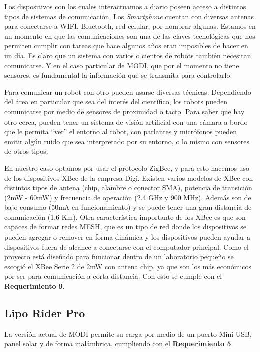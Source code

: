 Los dispositivos con los cuales interactuamos a diario poseen acceso a distintos tipos de sistemas de comunicación. Los \textit{Smartphone} cuentan con diversas antenas para conectarse a WIFI, Bluetooth, red celular,  por nombrar algunas. Estamos en un momento en que las comunicaciones son una de las claves tecnológicas que nos permiten cumplir con tareas que hace algunos años eran imposibles de hacer en un día. Es claro que un sistema con varios o cientos de robots también necesitan comunicarse. Y en el caso particular de MODI, que por el momento no tiene sensores, es fundamental la información que se transmita para controlarlo. 

Para comunicar un robot con otro pueden usarse diversas técnicas. Dependiendo del área en particular que sea del interés del científico, los robots pueden comunicarse por medio de sensores de proximidad o tacto. Para saber que hay otro cerca, pueden tener un sistema de visión artificial con una cámara a bordo que le permita “ver” el entorno al robot, con parlantes y micrófonos pueden emitir algún ruido que sea interpretado por su entorno, o lo mismo con sensores de otros tipos.

En nuestro caso optamos por usar el protocolo ZigBee, y para esto hacemos uso de los dispositivos XBee de la empresa Digi. Existen varios modelos de XBee con distintos tipos de antena (chip, alambre o conector SMA), potencia de transición (2mW - 60mW) y frecuencia de operación (2.4 GHz y 900 MHz). Además son de bajo consumo (50mA en funcionamiento) y se puede tener una gran distancia de comunicación (1.6 Km). Otra característica importante de los XBee es que son capaces de formar redes MESH, que es un tipo de red donde los dispositivos se pueden agregar o remover en forma dinámica y los dispositivos pueden ayudar a dispositivos fuera de alcance a  conectarse con el computador principal. Como el proyecto está diseñado para funcionar dentro de un laboratorio pequeño se escogió el XBee Serie 2 de 2mW con antena chip, ya que son los más económicos por ser para comunicación a corta distancia. Con esto se cumple con el \textbf{Requerimiento 9}.

\subsection{Lipo Rider Pro}
 La versión actual de MODI permite su carga por medio de un puerto Mini USB, panel solar y de forma inalámbrica. cumpliendo con el \textbf{Requerimiento 5}.


